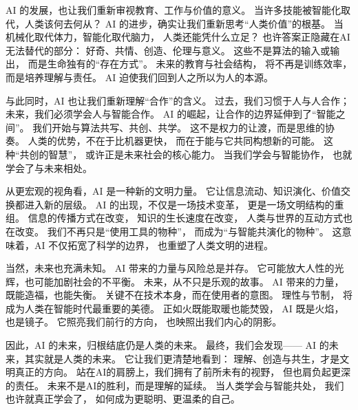 AI 的发展，也让我们重新审视教育、工作与价值的意义。  
当许多技能被智能化取代，人类该何去何从？  
AI 的进步，确实让我们重新思考“人类价值”的根基。  
当机械化取代体力，智能化取代脑力，  
人类还能凭什么立足？  
也许答案正隐藏在AI无法替代的部分：  
好奇、共情、创造、伦理与意义。  
这些不是算法的输入或输出，  
而是生命独有的“存在方式”。  
未来的教育与社会结构，  
将不再是训练效率，而是培养理解与责任。  
AI 迫使我们回到人之所以为人的本源。

与此同时，AI 也让我们重新理解“合作”的含义。  
过去，我们习惯于人与人合作；  
未来，我们必须学会人与智能合作。  
AI 的崛起，让合作的边界延伸到了“智能之间”。  
我们开始与算法共写、共创、共学。  
这不是权力的让渡，而是思维的协奏。  
人类的优势，不在于比机器更快，  
而在于能与它共同构想新的可能。  
这种“共创的智慧”，  
或许正是未来社会的核心能力。  
当我们学会与智能协作，  
也就学会了与未来相处。

从更宏观的视角看，AI 是一种新的文明力量。  
它让信息流动、知识演化、价值交换都进入新的层级。  
AI 的出现，不仅是一场技术变革，  
更是一场文明结构的重组。  
信息的传播方式在改变，  
知识的生长速度在改变，  
人类与世界的互动方式也在改变。  
我们不再只是“使用工具的物种”，  
而成为“与智能共演化的物种”。  
这意味着，AI 不仅拓宽了科学的边界，  
也重塑了人类文明的进程。

当然，未来也充满未知。  
AI 带来的力量与风险总是并存。  
它可能放大人性的光辉，也可能加剧社会的不平衡。  
未来，从不只是乐观的故事。  
AI 带来的力量，既能造福，也能失衡。  
关键不在技术本身，而在使用者的意图。  
理性与节制，  
将成为人类在智能时代最重要的美德。  
正如火既能取暖也能焚毁，  
AI 既是火焰，也是镜子。  
它照亮我们前行的方向，  
也映照出我们内心的阴影。

因此，AI 的未来，归根结底仍是人类的未来。  
最终，我们会发现——  
AI 的未来，其实就是人类的未来。  
它让我们更清楚地看到：  
理解、创造与共生，才是文明真正的方向。  
站在AI的肩膀上，我们拥有了前所未有的视野，  
但也肩负起更深的责任。  
未来不是AI的胜利，而是理解的延续。  
当人类学会与智能共处，  
我们也许就真正学会了，  
如何成为更聪明、更温柔的自己。











